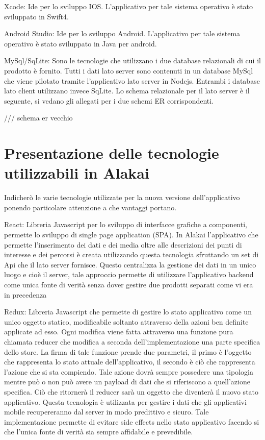	Xcode: Ide per lo sviluppo IOS. L’applicativo per tale sistema operativo è stato sviluppato in Swift4.\vspace{5mm}

	Android Studio: Ide per lo sviluppo Android. L’applicativo per tale sistema operativo è stato sviluppato in Java per android.\vspace{5mm}

	MySql/SqLite: Sono le tecnologie che utilizzano i due database relazionali di cui il prodotto è fornito. Tutti i dati lato server sono contenuti in un database MySql che viene pilotato tramite l’applicativo lato server in Nodejs. Entrambi i database lato client utilizzano invece SqLite. Lo schema relazionale per il lato server è il seguente, si vedano gli allegati per i due schemi ER corrispondenti.\vspace{5mm}
	
	/// schema er vecchio
	
\section{Presentazione delle tecnologie utilizzabili in Alakai}\vspace{5mm}
Indicherò le varie tecnologie utilizzate per la nuova versione dell'applicativo ponendo particolare attenzione a che vantaggi portano.\vspace{5mm}

React: Libreria Javascript per lo sviluppo di interfacce grafiche a componenti, permette lo sviluppo di single page application (SPA). In Alakai l’applicativo che permette l’inserimento dei dati e dei media oltre alle descrizioni dei punti di interesse e dei percorsi è creata utilizzando questa tecnologia sfruttando un set di Api che il lato server fornisce. Questo centralizza la gestione dei dati in un unico luogo e cioè il server, tale approccio permette di utilizzare l'applicativo backend come unica fonte di verità senza dover gestire due prodotti separati come vi era in precedenza\vspace{5mm}

	Redux: Libreria Javascript che permette di gestire lo stato applicativo come un unico oggetto statico, modificabile soltanto attraverso della azioni ben definite applicate ad esso. Ogni modifica viene fatta attraverso una funzione pura\cite{PureFunction} chiamata reducer che modifica a seconda dell'implementazione una parte specifica dello store. La firma di tale funzione prende due parametri, il primo è l'oggetto che rappresenta lo stato attuale dell'applicativo, il secondo è ciò che rappresenta l'azione che si sta compiendo. Tale azione dovrà sempre possedere una tipologia mentre può o non può avere un payload di dati che si riferiscono a quell'azione specifica. Ciò che ritornerà il reducer sarà un oggetto che diventerà il nuovo stato applicativo. Questa tecnologia è utilizzata per gestire i dati che gli applicativi mobile recupereranno dal server in modo predittivo e sicuro. Tale implementazione permette di evitare side effects\cite{SideEffects} nello stato applicativo facendo si che l'unica fonte di verità sia sempre affidabile e prevedibile. \vspace{5mm}
	
